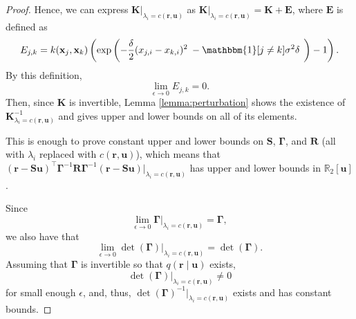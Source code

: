 \documentclass{mpaper}
\begin{document}
\begin{proof}
  Hence, we can express $\mathbf{K}|_{\lambda_i = c(\mathbf{r}, \mathbf{u})}$ as
  $\mathbf{K}|_{\lambda_i = c(\mathbf{r}, \mathbf{u})} = \mathbf{K} +
  \mathbf{E}$, where $\mathbf{E}$ is defined as
  \[
    E_{j,k} = k(\mathbf{x}_j, \mathbf{x}_k) \left( \exp \left(
        -\frac{\delta}{2}(x_{j,i} - x_{k,i})^2 \right. \right. -\mathbbm{1}[j
    \ne k]\sigma^2\delta \left. \left. \vphantom{\frac{1}{2}} \right) - 1
    \right).
  \]
  By this definition,
  \[
    \lim_{\epsilon \to 0} E_{j,k} = 0.
  \]
  Then, since $\mathbf{K}$ is invertible, Lemma \ref{lemma:perturbation} shows
  the existence of $\mathbf{K}^{-1}_{\lambda_i = c(\mathbf{r}, \mathbf{u})}$ and
  gives upper and lower bounds on all of its elements.

  This is enough to prove constant upper and lower bounds on
  $\mathbf{S}$, $\bm\Gamma$, and $\mathbf{R}$ (all with $\lambda_i$ replaced
  with $c(\mathbf{r}, \mathbf{u})$), which means that $(\mathbf{r} -
  \mathbf{Su})^\intercal\bm\Gamma^{-1}\mathbf{R}\bm\Gamma^{-1}(\mathbf{r} -
  \mathbf{Su})|_{\lambda_i = c(\mathbf{r}, \mathbf{u})}$ has upper and lower
  bounds in $\mathbb{R}_2[\mathbf{u}]$.
  
  Since
  \[
    \lim_{\epsilon \to 0} \bm\Gamma|_{\lambda_i = c(\mathbf{r}, \mathbf{u})} =
    \bm\Gamma,
  \]
  we also have that
  \[
    \lim_{\epsilon \to 0} \det(\bm\Gamma)|_{\lambda_i = c(\mathbf{r}, \mathbf{u})} =
    \det(\bm\Gamma).
  \]
  Assuming that
  $\bm\Gamma$ is invertible so that $q(\mathbf{r} \mid \mathbf{u})$ exists,
  \[
    \det(\bm\Gamma)|_{\lambda_i = c(\mathbf{r}, \mathbf{u})} \ne 0
  \]
  for small enough $\epsilon$, and, thus, $\det(\bm\Gamma)^{-1}|_{\lambda_i =
    c(\mathbf{r}, \mathbf{u})}$ exists and has constant bounds.


\end{proof}
\end{document}
